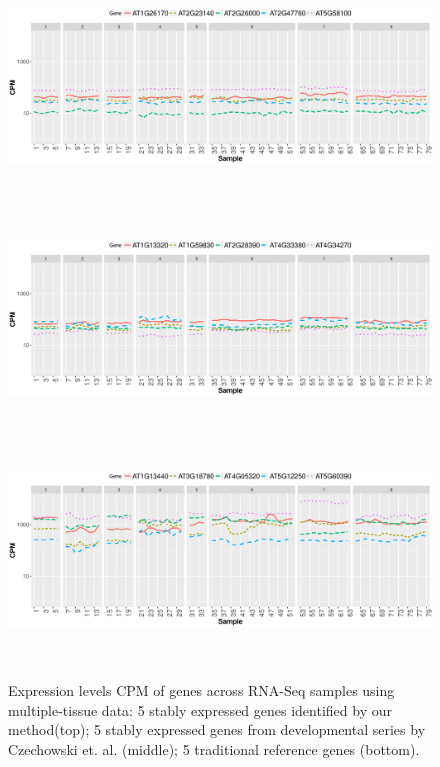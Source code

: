 \documentclass[11pt, a4paper]{article}
\begin{document}

 \begin{figure}[H]
\begin{center}
	\includegraphics[width=15cm,height=6cm]{Figures/A3.eps}
	\includegraphics[width=15cm,height=6cm]{Figures/A2.eps}
	\includegraphics[width=15cm,height=6cm]{Figures/A1.eps}
	\caption{{\small{\label{expressinlevel1} Expression levels CPM of genes across RNA-Seq samples using multiple-tissue data: 5 stably expressed genes identified by our method(top)}; 5 stably expressed genes from developmental series by Czechowski et. al. (middle); 5 traditional reference genes (bottom).}}
\end{center}
\end{figure} 
\end{document}
